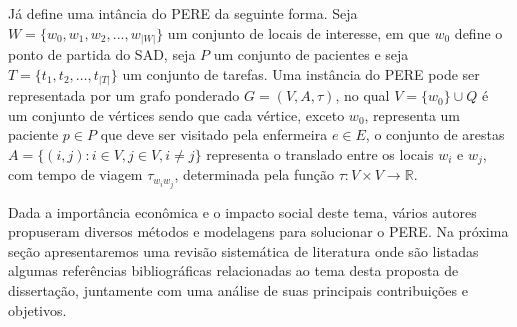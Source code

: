 J\'a \cite{mansini:2016} define uma int\^ancia do \ac{PERE} da seguinte forma. Seja $W = \{w_0, w_1, w_2, ..., w_{|W|}\}$ um conjunto de locais de interesse, em que $w_0$ define o ponto de partida do \ac{SAD}, seja $P$ um conjunto de pacientes e seja $T = \{ t_1, t_2, \ldots, t_{|T|}\}$ um conjunto de tarefas.  
Uma inst\^ancia do \ac{PERE} pode ser representada por um grafo ponderado $G = (V, A,\tau)$, no qual $V = \{w_0\} \cup Q$ é um conjunto de vértices sendo que cada vértice, exceto $w_0$, representa um paciente $p\in P$ que deve ser visitado pela enfermeira $e\in E$, o conjunto de arestas $A = \{ (i,j): i \in V, j \in V, i \neq j \}$ representa o translado entre os locais $w_i$ e $w_j$, com tempo de viagem $\tau_{w_iw_j}$, determinada pela função $\tau: V\times V \rightarrow \mathds{R}$. 

Dada a import\^ancia econ\^omica e o impacto social deste tema, v\'arios autores propuseram diversos m\'etodos e modelagens para solucionar o \ac{PERE}. Na pr\'oxima seç\~ao apresentaremos uma revis\~ao sistem\'atica de literatura onde s\~ao listadas algumas refer\^encias bibliogr\'aficas relacionadas ao tema desta proposta de dissertaç\~ao, juntamente com uma an\'alise de suas principais contribuiç\~oes e objetivos.







